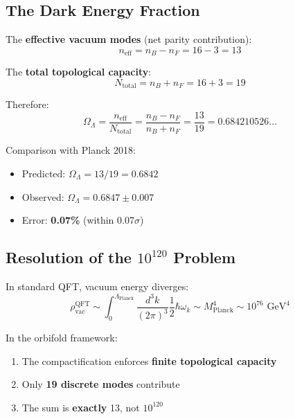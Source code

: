 \documentclass[12pt,a4paper]{article}
\newcommand{\OmegaL}{\Omega_\Lambda}
\newcommand{\nB}{n_B}
\newcommand{\nF}{n_F}
\newcommand{\Ntot}{N_{\text{total}}}
\newcommand{\neff}{n_{\text{eff}}}
\begin{document}
\subsection{The Dark Energy Fraction}

The \textbf{effective vacuum modes} (net parity contribution):
\begin{equation}
\neff = \nB - \nF = 16 - 3 = 13
\end{equation}

The \textbf{total topological capacity}:
\begin{equation}
\Ntot = \nB + \nF = 16 + 3 = 19
\end{equation}

Therefore:
\begin{equation}
\boxed{\OmegaL = \frac{\neff}{\Ntot} = \frac{\nB - \nF}{\nB + \nF} = \frac{13}{19} = 0.684210526...}
\end{equation}

\begin{keyresult}
Comparison with Planck 2018:
\begin{itemize}
    \item Predicted: $\OmegaL = 13/19 = 0.6842$
    \item Observed: $\OmegaL = 0.6847 \pm 0.007$
    \item Error: \textbf{0.07\%} (within 0.07$\sigma$)
\end{itemize}
\end{keyresult}

\subsection{Resolution of the $10^{120}$ Problem}

In standard QFT, vacuum energy diverges:
\begin{equation}
\rho_{\text{vac}}^{\text{QFT}} \sim \int_0^{\Lambda_{\text{Planck}}} \frac{d^3k}{(2\pi)^3} \frac{1}{2}\hbar\omega_k \sim M_{\text{Planck}}^4 \sim 10^{76} \text{ GeV}^4
\end{equation}

In the orbifold framework:
\begin{enumerate}
    \item The compactification enforces \textbf{finite topological capacity}
    \item Only \textbf{19 discrete modes} contribute
    \item The sum is \textbf{exactly} 13, not $10^{120}$
\end{enumerate}
\end{document}

